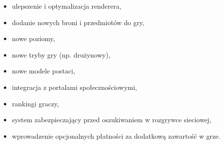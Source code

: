 \begin{itemize}
\item ulepszenie i optymalizacja renderera,
\item dodanie nowych broni i przedmiotów do gry,
\item nowe poziomy,
\item nowe tryby gry (np. drużynowy),
\item nowe modele postaci,
\item integracja z portalami społecznościowymi,
\item rankingi graczy,
\item system zabezpieczający przed oszukiwaniem w rozgrywce sieciowej,
\item wprowadzenie opcjonalnych płatności za dodatkową zawartość w grze.
\end{itemize}



